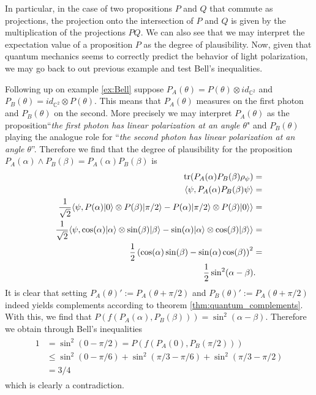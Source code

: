 In particular, in the case of two propositions $P$ and $Q$ that commute as projections, the projection onto the intersection of $P$ and $Q$ is given by the multiplication of the projections $PQ$. We can also see that we may interpret the expectation value of a proposition $P$ as the degree of plausibility. Now, given that quantum mechanics seems to correctly predict the behavior of light polarization, we may go back to out previous example and test Bell's inequalities.
\begin{example}
Following up on example \ref{ex:Bell} suppose $P_A(\theta)=P(\theta)\otimes id_{\mathbb{C}^2}$ and $P_B(\theta)=id_{\mathbb{C}^2}\otimes P(\theta)$. This means that $P_A(\theta)$ measures on the first photon and $P_B(\theta)$ on the second. More precisely we may interpret $P_A(\theta)$ as the proposition``\textit{the first photon has linear polarization at an angle $\theta$}" and $P_B(\theta)$ playing the analogue role for ``\textit{the second photon has linear polarization at an angle $\theta$}''. Therefore we find that the degree of plausibility for the proposition $P_A(\alpha)\wedge P_B(\beta)=P_A(\alpha)P_B(\beta)$ is
\begin{align}
\begin{split}
\operatorname{tr}(P_A(\alpha)P_B(\beta)\rho_\psi)&= \\
\langle \psi, P_A(\alpha)P_B(\beta)\psi\rangle &=\\ 
\frac{1}{\sqrt{2}}\langle \psi, P(\alpha)|0\rangle\otimes P(\beta)|\pi/2\rangle -P(\alpha)|\pi/2\rangle\otimes P(\beta)|0\rangle\rangle&=\\ 
\frac{1}{\sqrt{2}}\langle \psi, \cos(\alpha)|\alpha\rangle\otimes\sin(\beta)|\beta\rangle -\sin(\alpha)|\alpha\rangle\otimes\cos(\beta)|\beta\rangle\rangle&=\\
\frac{1}{2}\left(\cos(\alpha)\sin(\beta)-\sin(\alpha)\cos(\beta)\right)^2 &= \\
 \frac{1}{2}\sin^2(\alpha-\beta) &.
\end{split}
\end{align}  				
It is clear that setting $P_A(\theta)':=P_A(\theta+\pi/2)$ and $P_B(\theta)':=P_A(\theta+\pi/2)$ indeed yields complements according to theorem \ref{thm:quantum_complements}. With this, we find that $P(f(P_A(\alpha),P_B(\beta)))=\sin^2(\alpha-\beta)$. Therefore we obtain through Bell's inequalities
\begin{align}
\begin{split}
1&=\sin^2(0-\pi/2)= P(f(P_A(0),P_B(\pi/2)))\\ 
&\leq\sin^2(0-\pi/6) + \sin^2(\pi/3-\pi/6) + \sin^2(\pi/3-\pi/2) \\
&= 3/4
\end{split}
\end{align}
which is clearly a contradiction.
\end{example}
